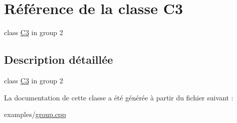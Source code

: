 \hypertarget{class_c3}{}\section{Référence de la classe C3}
\label{class_c3}


class \hyperlink{class_c3}{C3} in group 2  




\subsection{Description détaillée}
class \hyperlink{class_c3}{C3} in group 2 

La documentation de cette classe a été générée à partir du fichier suivant \+:\begin{DoxyCompactItemize}
\item 
examples/\hyperlink{group_8cpp}{group.\+cpp}\end{DoxyCompactItemize}
